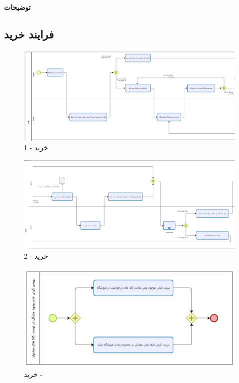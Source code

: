 \documentclass[12pt,a4paper]{article}
\begin{document}
	\textbf{توضیحات}
	
	
	\pagebreak

\subsection{فرایند خرید} \label{section.function.buy}
	\begin{figure}[h!]
		\begin{center}
			\includegraphics[width=14cm]{images/Bizagi Buy 1.png}	
		\end{center}
		\caption{خرید - 1}
	\end{figure}
	\begin{figure}[h!]
		\begin{center}
			\includegraphics[width=14cm]{images/Bizagi Buy 2.png}	
		\end{center}
		\caption{خرید - 2}
	\end{figure}
	\pagebreak
	\begin{figure}[h!]
		\begin{center}
			\includegraphics[width=14cm]{images/Bizagi Buy Sub-Process.png}	
		\end{center}
		\caption{خرید - }
	\end{figure}
\end{document}
